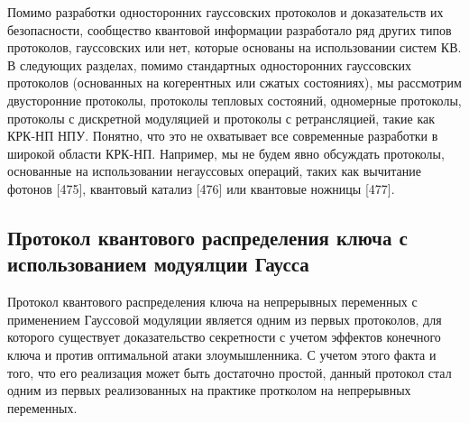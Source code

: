 Помимо разработки односторонних гауссовских протоколов и доказательств их безопасности, сообщество квантовой информации разработало ряд других типов протоколов, гауссовских или нет, которые основаны на использовании систем КВ. В следующих разделах, помимо стандартных односторонних гауссовских протоколов (основанных на когерентных или сжатых состояниях), мы рассмотрим двусторонние протоколы, протоколы тепловых состояний, одномерные  протоколы, протоколы с дискретной модуляцией и протоколы с ретрансляцией, такие как КРК-НП НПУ. Понятно, что это не охватывает все современные разработки в широкой области КРК-НП. Например, мы не будем явно обсуждать протоколы, основанные на использовании негауссовых операций, таких как вычитание фотонов [475], квантовый катализ [476] или квантовые ножницы [477].


\subsection{Протокол квантового распределения ключа с использованием модуялции Гаусса}\label{sec:ch1/sect4/GG02}
Протокол квантового распределения ключа на непрерывных переменных с применением Гауссовой модуляции является одним из первых протоколов, для которого существует доказательство секретности с учетом эффектов конечного ключа и против оптимальной атаки злоумышленника. С учетом этого факта и того, что его реализация может быть достаточно простой, данный протокол стал одним из первых реализованных на практике протколом на непрерывных переменных. 
